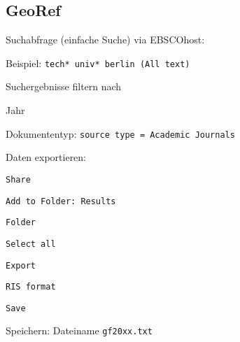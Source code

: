 \subsection*{GeoRef}
\begin{compactitem}
\item Suchabfrage (einfache Suche) via EBSCOhost:
	\begin{compactitem}
	\item Beispiel: \texttt{tech* univ* berlin (All text)}
	\end{compactitem}
\item Suchergebnisse filtern nach
	\begin{compactitem}
    \item Jahr
    \item Dokumententyp: \texttt{source type = Academic Journals}
    \end{compactitem}
\item Daten exportieren: 
	\begin{compactitem}
	\item \texttt{Share}
    \item \texttt{Add to Folder: Results}
    \item \texttt{Folder}
    \item \texttt{Select all}
    \item \texttt{Export}
    \item \texttt{RIS format}
    \item \texttt{Save}
	\end{compactitem}
\item Speichern: Dateiname \texttt{gf20xx.txt}
\end{compactitem}

